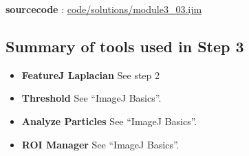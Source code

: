 \textbf{sourcecode} : \href{http://www.example.com/contents}{code/solutions/module3\_03.ijm}

\subsection{Summary of tools used in Step 3}

\begin{itemize}
\item\textbf{FeatureJ Laplacian} See step 2

\item\textbf{Threshold} See ``ImageJ Basics''.
\item\textbf{Analyze Particles} See ``ImageJ Basics''.
\item\textbf{ROI Manager} See ``ImageJ Basics''.

\end{itemize}

\newpage